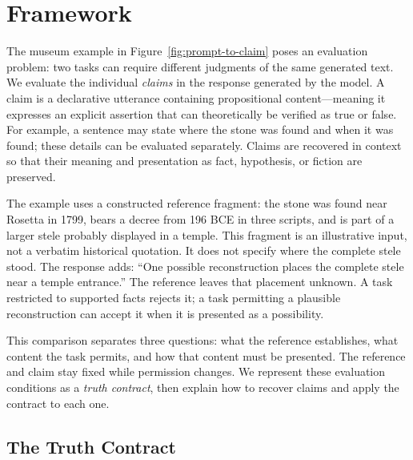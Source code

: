 \documentclass{clv2025}
\begin{document}
\section{Framework}\label{sec:framework}

The museum example in Figure~\ref{fig:prompt-to-claim} poses an evaluation
problem: two tasks can require different judgments of the same generated
text. We evaluate the individual \emph{claims} in the response generated
by the model. A claim is a declarative utterance containing propositional content—meaning it expresses an explicit assertion  that can theoretically be verified as true or false. %
For example, a sentence may state where the
stone was found and when it was found; these details can be evaluated
separately. Claims are recovered in context so that their meaning and
presentation as fact, hypothesis, or fiction are preserved.

The example uses a constructed reference fragment: the stone was found
near Rosetta in 1799, bears a decree from 196 BCE in three scripts, and is
part of a larger stele probably displayed in a temple. This fragment is an
illustrative input, not a verbatim historical quotation. It does not specify
where the complete stele stood. The response adds: ``One possible
reconstruction places the complete stele near a temple entrance.'' The
reference leaves that placement unknown. A task restricted to supported
facts rejects it; a task permitting a plausible reconstruction can accept
it when it is presented as a possibility.

This comparison separates three questions: what the reference establishes,
what content the task permits, and how that content must be presented.
The reference and claim stay fixed while permission changes. We represent
these evaluation conditions as a \emph{truth contract}, then explain how
to recover claims and apply the contract to each one.

\subsection{The Truth Contract}\label{subsec:contract}
\end{document}
